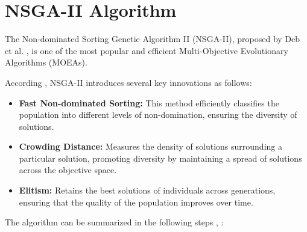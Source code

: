\section{NSGA-II Algorithm}

The Non-dominated Sorting Genetic Algorithm II (NSGA-II), proposed by Deb et al. \cite{IEEE Transactions on Evolutionary Computation}, is one of the most popular and efficient Multi-Objective Evolutionary Algorithms (MOEAs).

According \cite{IEEE Transactions on Evolutionary Computation} , NSGA-II introduces several key innovations as follows:
\begin{itemize}
    \item \textbf{Fast Non-dominated Sorting:} This method efficiently classifies the population into different levels of non-domination, ensuring the diversity of solutions.
    \item \textbf{Crowding Distance:} Measures the density of solutions surrounding a particular solution, promoting diversity by maintaining a spread of solutions across the objective space.
    \item \textbf{Elitism:} Retains the best solutions of individuals across generations, ensuring that the quality of the population improves over time.
\end{itemize}

The algorithm can be summarized in the following steps \cite{IEEE Transactions on Evolutionary Computation}, \cite{deb2002nsga2}:

